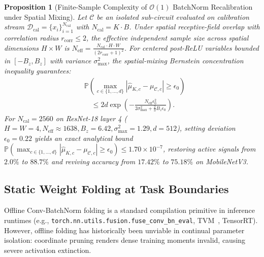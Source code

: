 \documentclass{article}
\newtheorem{proposition}[theorem]{Proposition}
\begin{document}
\begin{proposition}[Finite-Sample Complexity of $\mathcal{O}(1)$ BatchNorm Recalibration under Spatial Mixing]
\label{prop:bn_bound}
Let $\mathcal{C}$ be an isolated sub-circuit evaluated on calibration stream $\mathcal{D}_{\text{cal}} = \{x_i\}_{i=1}^{N_{\text{cal}}}$ with $N_{\text{cal}} = K \cdot B$. Under spatial receptive-field overlap with correlation radius $r_{\mathrm{corr}} \le 2$, the effective independent sample size across spatial dimensions $H \times W$ is $N_{\mathrm{eff}} = \frac{N_{\mathrm{cal}} \cdot H \cdot W}{(2r_{\mathrm{corr}} + 1)^2}$. For centered post-ReLU variables bounded in $[-B_z, B_z]$ with variance $\sigma_{\max}^2$, the spatial-mixing Bernstein concentration inequality guarantees:
\begin{equation}
\label{eq:bn_concentration}
\begin{aligned}
    &\mathbb{P}\left( \max_{c \in \{1, \dots, d\}} |\hat{\mu}_{K, c} - \mu_{\mathcal{C}, c}| \geq \epsilon_0 \right) \\
    &\quad \leq 2d \exp\left( - \frac{N_{\mathrm{eff}} \epsilon_0^2}{2 \sigma_{\max}^2 + \frac{2}{3} B_z \epsilon_0} \right).
\end{aligned}
\end{equation}
For $N_{\mathrm{cal}} = 2560$ on ResNet-18 layer 4 ($H=W=4, N_{\mathrm{eff}} \approx 1638, B_z = 6.42, \sigma_{\max}^2 = 1.29, d=512$), setting deviation $\epsilon_0 = 0.22$ yields an exact analytical bound $\mathbb{P}\left(\max_{c\in\{1,\dots,d\}} |\hat{\mu}_{K,c} - \mu_{\mathcal{C},c}| \ge \epsilon_0\right) \le 1.70 \times 10^{-7}$, restoring active signals from $2.0\%$ to $88.7\%$ and reviving accuracy from $17.42\%$ to $75.18\%$ on MobileNetV3.
\end{proposition}

\subsection{Static Weight Folding at Task Boundaries}
Offline Conv-BatchNorm folding is a standard compilation primitive in inference runtimes (e.g., \texttt{torch.nn.utils.fusion.fuse\_conv\_bn\_eval}, TVM~\cite{chen2018tvm}, TensorRT). However, offline folding has historically been unviable in continual parameter isolation: coordinate pruning renders dense training moments invalid, causing severe activation extinction.
\end{document}
